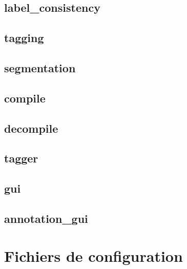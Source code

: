 \documentclass[12pt]{article}
\begin{document}
        \subsection{label\_consistency}
        \label{subsec:module-label-consistency}
        

        \subsection{tagging}
        \label{subsec:module-tagging}
        

        \subsection{segmentation}
        \label{subsec:module-segmentation}
        

        \subsection{compile}
        \label{subsec:module-compile}
        

        \subsection{decompile}
        \label{subsec:module-decompile}
        

        \subsection{tagger}
        \label{subsec:module-tagger}
        

        \subsection{gui}
        \label{subsec:module-gui}
        

        \subsection{annotation\_gui}
        \label{subsec:module-annotation-gui}
        
    
    \section{Fichiers de configuration}
    \label{sec:config-files}
\end{document}

